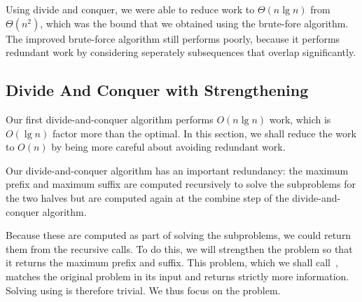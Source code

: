 \begin{cluster}
\label{grp:tch:mcss::using}

\begin{teachnote}
\label{tch:mcss::using}
Using divide and conquer, we were able to reduce work to
$\Theta(n\lg{n})$ from $\Theta(n^2)$, which was the bound that we
obtained using the brute-fore algorithm.
The improved brute-force algorithm still performs poorly, because it
performs  redundant work by considering seperately subsequences
that overlap significantly.  

\end{teachnote}
\end{cluster}


\subsection{Divide And Conquer with Strengthening}
\label{sec:mcss::divide-and-conquer-with-strengthening}

\begin{cluster}
\label{grp:grm:mcss::divide-and-conquer}

\begin{gram}
\label{grm:mcss::divide-and-conquer}
Our first divide-and-conquer algorithm performs $O(n \lg n)$ work,
which is $O(\lg{n})$ factor more than the optimal.
In this section, we shall reduce the work to $O(n)$ by being more
careful about avoiding redundant work.

\end{gram}
\end{cluster}

\begin{cluster}
\label{grp:grm:mcss::intuition}

\begin{gram}[Intuition]
\label{grm:mcss::intuition}
Our divide-and-conquer algorithm has an important redundancy: the
maximum prefix and maximum suffix are computed recursively to solve
the subproblems for the two halves but are computed again at the
combine step of the divide-and-conquer algorithm.

Because these are computed as part of solving the subproblems, we
could return them from the recursive calls.  
To do this, we will strengthen the problem so that it returns the
maximum prefix and suffix.  
This problem, which we shall call~, matches the
original \MCSS{} problem in its input and returns strictly more
information.
Solving \MCSS{} using \MCSSPS{} is therefore trivial.  
We thus focus on the \MCSSPS{} problem.

\end{gram}
\end{cluster}

